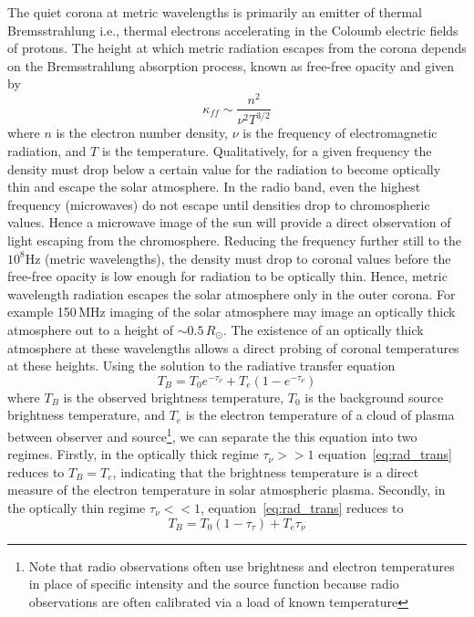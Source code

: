 The quiet corona at metric wavelengths is primarily an emitter of thermal Bremsstrahlung i.e., thermal electrons accelerating in the Coloumb electric fields of protons. The height at which metric radiation escapes from the corona depends on the Bremsstrahlung absorption process, known as free-free opacity and given by
\begin{equation}
\kappa_{ff} \sim \frac{n^2}{\nu^2T^{3/2}} 
\end{equation}
where $n$ is the electron number density, $\nu$ is the frequency of electromagnetic radiation, and $T$ is the temperature. Qualitatively, for a given frequency the density must drop below a certain value for the radiation to become optically thin and escape the solar atmosphere. In the radio band, even the highest frequency (microwaves) do not escape until densities drop to chromospheric values. Hence a microwave image of the sun will provide a direct observation of light escaping from the chromosphere. Reducing the frequency further still to the $10^{8}$Hz (metric wavelengths), the density must drop to coronal values before the free-free opacity is low enough for radiation to be optically thin. Hence, metric wavelength radiation escapes the solar atmosphere only in the outer corona. For example 150\,MHz imaging of the solar atmosphere may image an optically thick atmosphere out to a height of $\sim 0.5\,R_{\odot}$. The existence of an optically thick atmosphere at these wavelengths allows a direct probing of coronal temperatures at these heights. Using the solution to the radiative transfer equation
\begin{equation}
T_B = T_0e^{-\tau_{\nu}} + T_e(1-e^{-\tau_{\nu}})
\label{eq:rad_trans}
\end{equation}
where $T_B$ is the observed brightness temperature, $T_0$ is the background source brightness temperature, and $T_e$ is the electron temperature of a cloud of plasma between observer and source\footnote{Note that radio observations often use brightness and electron temperatures in place of specific intensity and the source function because radio observations are often calibrated via a load of known temperature}, we can separate the this equation into two regimes. Firstly,
in the optically thick regime $\tau_{\nu}>>1$ equation~\ref{eq:rad_trans} reduces to $T_B = T_e$, indicating that the brightness temperature is a direct measure of the electron temperature in solar atmospheric plasma. Secondly, in the optically thin regime $\tau_{\nu}<<1$, equation~\ref{eq:rad_trans} reduces to 
\begin{equation}
T_B = T_0(1-\tau_{\tau}) + T_e\tau_{\nu}
\end{equation}
